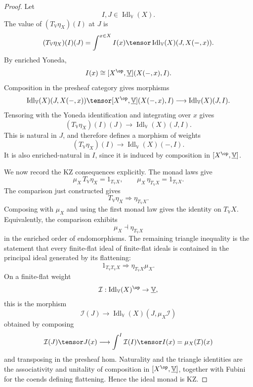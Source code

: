 \begin{proof}
Let
\[
    I,J\in\operatorname{Idl}_{\mathbb V}(X).
\]
The value of \((T_{\mathbb V}\eta_X)(I)\) at \(J\) is
\[
    (T_{\mathbb V}\eta_X)(I)(J)
    =
    \int^{x\in X}
        I(x)\tensor
        \operatorname{Idl}_{\mathbb V}(X)(J,X(-,x)).
\]
By enriched Yoneda,
\[
    I(x)
    \cong
    [X^{\op},\underline{\mathbb V}](X(-,x),I).
\]
Composition in the presheaf category gives morphisms
\[
    \operatorname{Idl}_{\mathbb V}(X)(J,X(-,x))
    \tensor
    [X^{\op},\underline{\mathbb V}](X(-,x),I)
    \longrightarrow
    \operatorname{Idl}_{\mathbb V}(X)(J,I).
\]
Tensoring with the Yoneda identification and integrating over \(x\) gives
\[
    (T_{\mathbb V}\eta_X)(I)(J)
    \longrightarrow
    \operatorname{Idl}_{\mathbb V}(X)(J,I).
\]
This is natural in \(J\), and therefore defines a morphism of weights
\[
    (T_{\mathbb V}\eta_X)(I)
    \longrightarrow
    \operatorname{Idl}_{\mathbb V}(X)(-,I).
\]
It is also enriched-natural in \(I\), since it is induced by composition in
\([X^{\op},\underline{\mathbb V}]\).

We now record the KZ consequences explicitly.  The monad laws give
\[
    \mu_X\,T_{\mathbb V}\eta_X=1_{T_{\mathbb V}X},
    \qquad
    \mu_X\,\eta_{T_{\mathbb V}X}=1_{T_{\mathbb V}X}.
\]
The comparison just constructed gives
\[
    T_{\mathbb V}\eta_X\Longrightarrow \eta_{T_{\mathbb V}X}.
\]
Composing with \(\mu_X\) and using the first monad law gives the identity on
\(T_{\mathbb V}X\).  Equivalently, the comparison exhibits
\[
    \mu_X\dashv \eta_{T_{\mathbb V}X}
\]
in the enriched order of endomorphisms.  The remaining triangle inequality is the
statement that every finite-flat ideal of finite-flat ideals is contained in the
principal ideal generated by its flattening:
\[
    1_{T_{\mathbb V}T_{\mathbb V}X}
    \Longrightarrow
    \eta_{T_{\mathbb V}X}\mu_X.
\]
On a finite-flat weight
\[
    \mathcal I:
    \operatorname{Idl}_{\mathbb V}(X)^{\op}\to\underline{\mathbb V},
\]
this is the morphism
\[
    \mathcal I(J)
    \longrightarrow
    \operatorname{Idl}_{\mathbb V}(X)(J,\mu_X\mathcal I)
\]
obtained by composing
\[
    \mathcal I(J)\tensor J(x)
    \longrightarrow
    \int^{I}\mathcal I(I)\tensor I(x)
    =
    \mu_X(\mathcal I)(x)
\]
and transposing in the presheaf hom.  Naturality and the triangle identities are
the associativity and unitality of composition in
\([X^{\op},\underline{\mathbb V}]\), together with Fubini for the coends defining
flattening.  Hence the ideal monad is KZ.
\end{proof}

